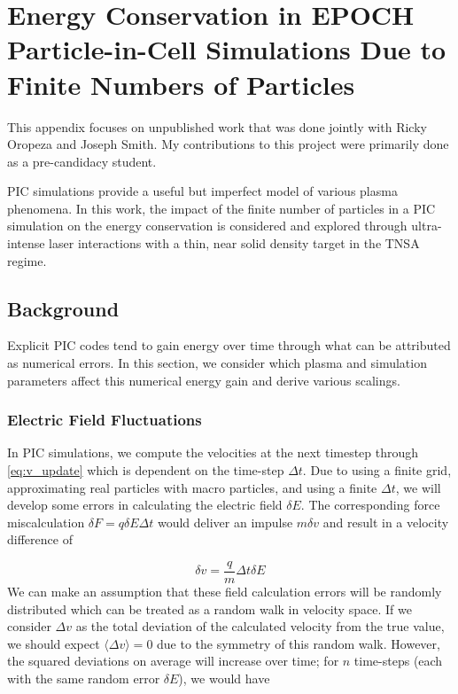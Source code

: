 \chapter{Energy Conservation in EPOCH Particle-in-Cell Simulations Due to Finite Numbers of Particles}
This appendix focuses on unpublished work that was done jointly with Ricky Oropeza and Joseph Smith. My contributions to this project were primarily done as a pre-candidacy student.

\gls{PIC} simulations provide a useful but imperfect model of various plasma phenomena. In this work, the impact of the finite number of particles in a PIC simulation on the energy conservation is considered and explored through ultra-intense laser interactions with a thin, near solid density target in the \gls{TNSA} regime. 

\section{Background}

Explicit PIC codes tend to gain energy over time through what can be attributed as numerical errors. In this section, we consider which plasma and simulation parameters affect this numerical energy gain and derive various scalings. 

\subsection{Electric Field Fluctuations}

In PIC simulations, we compute the velocities at the next timestep through \cref{eq:v_update} which is dependent on the time-step $\Delta t$. Due to using a finite grid, approximating real particles with macro particles, and using a finite $\Delta t$, we will develop some errors in calculating the electric field $\delta E$. The corresponding force miscalculation $\delta F = q \delta E \Delta t$ would deliver an impulse $m \delta v$ and result in a velocity difference \cite{Hockney_1988_PIC} of

\begin{equation}
	\delta v = \frac{q}{m} \Delta t \delta E
\end{equation}
We can make an assumption that these field calculation errors will be randomly distributed which can be treated as a random walk in velocity space. If we consider $\Delta v$ as the total deviation of the calculated velocity from the true value, we should expect $\langle \Delta v \rangle = 0$ due to the symmetry of this random walk. However, the squared deviations on average will increase over time; for $n$ time-steps (each with the same random error $\delta E$), we would have 

